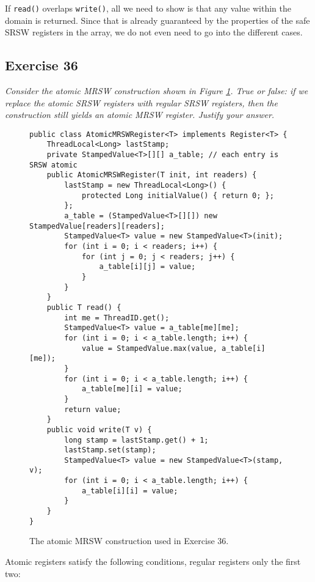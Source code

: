 \documentclass[a4paper,10pt]{article}
\begin{document}
If \lstinline|read()| overlaps \lstinline|write()|, all we need to show is that
any value within the domain is returned. Since that is already guaranteed
by the properties of the safe SRSW registers in the array, we do not even need
to go into the different cases.


\subsection{Exercise 36}

\emph{Consider the atomic MRSW construction shown in Figure \ref{fig:atomicmrsw}. True
or false: if we replace the atomic SRSW registers with regular SRSW registers,
then the construction still yields an atomic MRSW register. Justify your answer.}

\vspace{3mm}

\begin{figure}
\begin{lstlisting}
public class AtomicMRSWRegister<T> implements Register<T> {
    ThreadLocal<Long> lastStamp;
    private StampedValue<T>[][] a_table; // each entry is SRSW atomic
    public AtomicMRSWRegister(T init, int readers) {
        lastStamp = new ThreadLocal<Long>() {
            protected Long initialValue() { return 0; };
        };
        a_table = (StampedValue<T>[][]) new StampedValue[readers][readers];
        StampedValue<T> value = new StampedValue<T>(init);
        for (int i = 0; i < readers; i++) {
            for (int j = 0; j < readers; j++) {
                a_table[i][j] = value;
            }
        }
    }
    public T read() {
        int me = ThreadID.get();
        StampedValue<T> value = a_table[me][me];
        for (int i = 0; i < a_table.length; i++) {
            value = StampedValue.max(value, a_table[i][me]);
        }
        for (int i = 0; i < a_table.length; i++) {
            a_table[me][i] = value;
        }
        return value;
    }
    public void write(T v) {
        long stamp = lastStamp.get() + 1;
        lastStamp.set(stamp);
        StampedValue<T> value = new StampedValue<T>(stamp, v);
        for (int i = 0; i < a_table.length; i++) {
            a_table[i][i] = value;
        }
    }
}
\end{lstlisting}
\caption{The atomic MRSW construction used in Exercise 36.}
\label{fig:atomicmrsw}
\end{figure}

Atomic registers satisfy the following conditions, regular registers only the first two:
\end{document}
